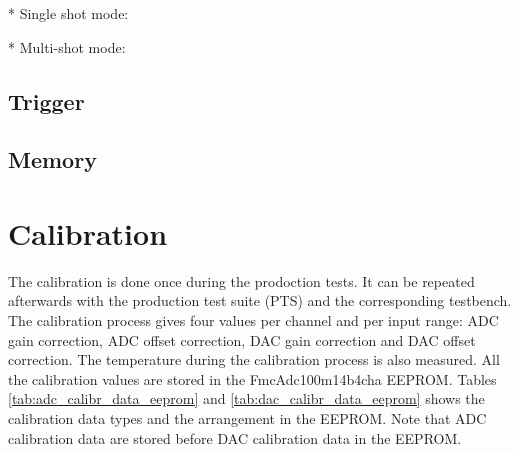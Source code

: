 \documentclass[11pt,a4paper]{article}
\begin{document}
* Single shot mode:


* Multi-shot mode:


\subsection{Trigger}


\subsection{Memory}


\section{Calibration}

The calibration is done once during the prodoction tests.
It can be repeated afterwards with the production test suite (PTS) and the corresponding testbench.
The calibration process gives four values per channel and per input range:
ADC gain correction, ADC offset correction, DAC gain correction and DAC offset correction.
The temperature during the calibration process is also measured.
All the calibration values are stored in the FmcAdc100m14b4cha EEPROM.
Tables \ref{tab:adc_calibr_data_eeprom} and \ref{tab:dac_calibr_data_eeprom} shows the calibration data types and the arrangement in the EEPROM.
Note that ADC calibration data are stored before DAC calibration data in the EEPROM.
\end{document}
